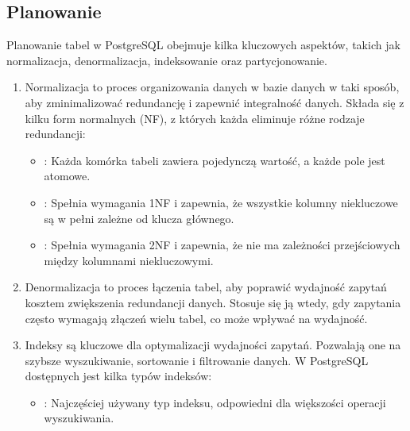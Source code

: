 \documentclass[letterpaper,10pt,polish]{sphinxmanual}
\begin{document}
\subsection{Planowanie}
\label{\detokenize{Konfiguracja-bazy-danych:planowanie}}
\sphinxAtStartPar
Planowanie tabel w PostgreSQL obejmuje kilka kluczowych aspektów, takich jak normalizacja, denormalizacja, indeksowanie oraz partycjonowanie.
\begin{enumerate}
%
\item {} 
\sphinxAtStartPar
{} \sphinxhyphen{} Normalizacja to proces organizowania danych w bazie danych w taki sposób, aby zminimalizować redundancję i zapewnić integralność danych. Składa się z kilku form normalnych (NF), z których każda eliminuje różne rodzaje redundancji:
\begin{itemize}
\item {} 
\sphinxAtStartPar
{}: Każda komórka tabeli zawiera pojedynczą wartość, a każde pole jest atomowe.

\item {} 
\sphinxAtStartPar
{}: Spełnia wymagania 1NF i zapewnia, że wszystkie kolumny niekluczowe są w pełni zależne od klucza głównego.

\item {} 
\sphinxAtStartPar
{}: Spełnia wymagania 2NF i zapewnia, że nie ma zależności przejściowych między kolumnami niekluczowymi.

\end{itemize}

\item {} 
\sphinxAtStartPar
{} \sphinxhyphen{} Denormalizacja to proces łączenia tabel, aby poprawić wydajność zapytań kosztem zwiększenia redundancji danych. Stosuje się ją wtedy, gdy zapytania często wymagają złączeń wielu tabel, co może wpływać na wydajność.

\item {} 
\sphinxAtStartPar
{} \sphinxhyphen{} Indeksy są kluczowe dla optymalizacji wydajności zapytań. Pozwalają one na szybsze wyszukiwanie, sortowanie i filtrowanie danych. W PostgreSQL dostępnych jest kilka typów indeksów:
\begin{itemize}
\item {} 
\sphinxAtStartPar
{}: Najczęściej używany typ indeksu, odpowiedni dla większości operacji wyszukiwania.


\end{itemize}
\end{enumerate}
\end{document}
